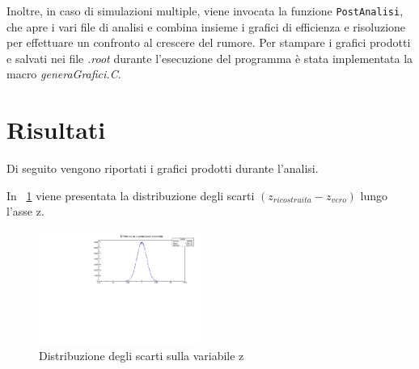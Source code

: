 \documentclass[11pt,a4paper]{article}
\begin{document}
Inoltre, in caso di simulazioni multiple, viene invocata la funzione \lstinline{PostAnalisi}, che apre i vari file di analisi e combina insieme i grafici di efficienza e risoluzione per effettuare un confronto al crescere del rumore.
Per stampare i grafici prodotti e salvati nei file \textit{.root} durante l'esecuzione del programma è stata implementata la macro \textit{generaGrafici.C}.

\section{Risultati}
Di seguito vengono riportati i grafici prodotti durante l'analisi.
\par In \figurename~\ref{zDIff} viene presentata la distribuzione degli scarti $(z_{ricostruita}-z_{vero})$ lungo l'asse z.
\begin{figure}[h!]
    \centering
    \includegraphics[width=0.47\textwidth]{Immagini/zDiff.pdf}
    \caption{Distribuzione degli scarti sulla variabile z}
    \label{zDIff}
\end{figure}
\end{document}
